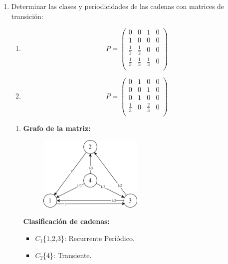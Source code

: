 \documentclass{templateNote}
\begin{document}
\begin{enumerate}
    \newpage
    \item Determinar las clases y periodicidades de las cadenas con matrices de transición:
    \begin{enumerate}[label=\alph*)]
        \item
        \[
        P = \left(
        \begin{array}{cccc}
            0           & 0           & 1           & 0\\
            1           & 0           & 0           & 0\\
            \frac{1}{2} & \frac{1}{2} & 0           & 0\\
            \frac{1}{3} & \frac{1}{3} & \frac{1}{3} & 0\\
        \end{array}
        \right)
        \]
        \item
        \[
        P = \left(
        \begin{array}{cccc}
            0           & 1 & 0           & 0\\
            0           & 0 & 1           & 0\\
            0           & 1 & 0           & 0\\
            \frac{1}{3} & 0 & \frac{2}{3} & 0\\
        \end{array}
        \right)
        \]
    \end{enumerate}

    \begin{enumerate}[label=\alph*)]    
        \item \textbf{Grafo de la matriz:}
        \begin{figure}[H]
            \centering
            \includegraphics[width=0.5\textwidth]{img/ejer4.png}
        \end{figure}
        \textbf{Clasificación de cadenas:}
        \begin{itemize}
            \item $C_1$\{1,2,3\}: Recurrente Periódico.
            \item $C_2$\{4\}: Transiente.
        \end{itemize}


\end{enumerate}
\end{enumerate}
\end{document}
